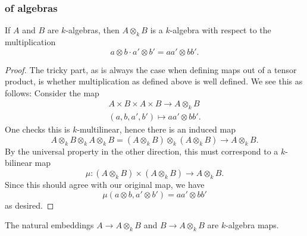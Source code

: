 \documentclass[12pt]{article}
\begin{document}

\subsubsection{of algebras} %

\begin{proposition}
	If $A$ and $B$ are $k$-algebras, then $A\otimes_k B$ is a $k$-algebra with respect to the multiplication 
	\begin{equation*}
		a\otimes b \cdot a'\otimes b' = aa'\otimes bb'.
	\end{equation*}
\end{proposition}
\begin{proof}
	The tricky part, as is always the case when defining maps out of a tensor product, is whether multiplication as defined above is well defined. We see this as follows: Consider the map 
	\begin{gather*}
		A\times B\times A\times B \to A\otimes_k B \\
		(a,b,a',b') \mapsto aa'\otimes bb'.
	\end{gather*}
	One checks this is $k$-multilinear, hence there is an induced map 
	\begin{equation*}
		A\otimes_k B\otimes_k A\otimes_k B = (A\otimes_k B) \otimes_k (A\otimes_k B) \to A\otimes_k B. 	
	\end{equation*}
	By the universal property in the other direction, this must correspond to a $k$-bilinear map 
	\begin{equation*}
		\mu: (A\otimes_k B)\times (A\otimes_k B)\to A\otimes_k B.
	\end{equation*}
	Since this should agree with our original map, we have 
	\begin{equation*}
		\mu(a\otimes b, a'\otimes b') = aa'\otimes bb'
	\end{equation*}
	as desired.
\end{proof}

\begin{corollary}
	The natural embeddings $A\to A\otimes_k B$ and $B\to A\otimes_k B$ are $k$-algebra maps.
\end{corollary}
\end{document}
